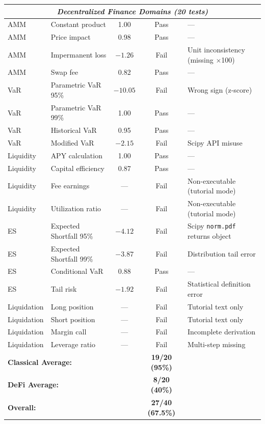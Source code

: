 \begin{table}[H]
\begin{small}
\begin{tabular}{@{}llccp{4.5cm}@{}}
\midrule
\multicolumn{5}{c}{\textit{Decentralized Finance Domains (20 tests)}} \\
\midrule
AMM & Constant product & 1.00 & Pass & --- \\
AMM & Price impact & 0.98 & Pass & --- \\
AMM & Impermanent loss & $-1.26$ & Fail & Unit inconsistency (missing $\times$100) \\
AMM & Swap fee & 0.82 & Pass & --- \\
VaR & Parametric VaR 95\% & $-10.05$ & Fail & Wrong sign (z-score) \\
VaR & Parametric VaR 99\% & 1.00 & Pass & --- \\
VaR & Historical VaR & 0.95 & Pass & --- \\
VaR & Modified VaR & $-2.15$ & Fail & Scipy API misuse \\
Liquidity & APY calculation & 1.00 & Pass & --- \\
Liquidity & Capital efficiency & 0.87 & Pass & --- \\
Liquidity & Fee earnings & --- & Fail & Non-executable (tutorial mode) \\
Liquidity & Utilization ratio & --- & Fail & Non-executable (tutorial mode) \\
ES & Expected Shortfall 95\% & $-4.12$ & Fail & Scipy \texttt{norm.pdf} returns object \\
ES & Expected Shortfall 99\% & $-3.87$ & Fail & Distribution tail error \\
ES & Conditional VaR & 0.88 & Pass & --- \\
ES & Tail risk & $-1.92$ & Fail & Statistical definition error \\
Liquidation & Long position & --- & Fail & Tutorial text only \\
Liquidation & Short position & --- & Fail & Tutorial text only \\
Liquidation & Margin call & --- & Fail & Incomplete derivation \\
Liquidation & Leverage ratio & --- & Fail & Multi-step missing \\
\midrule
\multicolumn{3}{l}{\textbf{Classical Average:}} & \textbf{19/20 (95\%)} & \\
\multicolumn{3}{l}{\textbf{DeFi Average:}} & \textbf{8/20 (40\%)} & \\
\multicolumn{3}{l}{\textbf{Overall:}} & \textbf{27/40 (67.5\%)} & \\
\bottomrule
\end{tabular}
\end{small}
\end{table}

